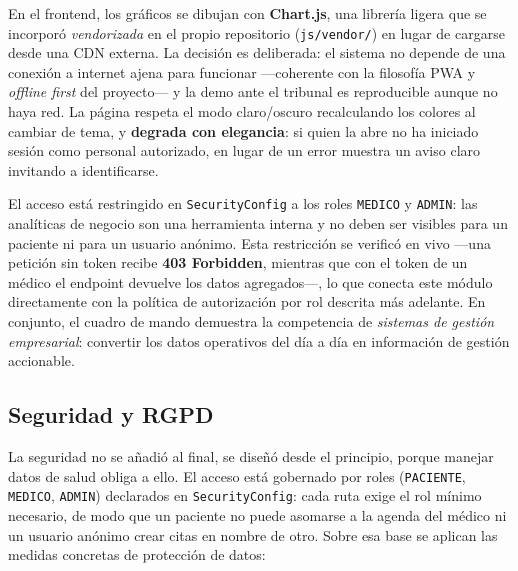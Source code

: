 \documentclass[12pt,a4paper]{report}
\begin{document}
En el frontend, los gráficos se dibujan con \textbf{Chart.js}, una librería ligera que se incorporó \emph{vendorizada} en el propio repositorio (\texttt{js/vendor/}) en lugar de cargarse desde una CDN externa. La decisión es deliberada: el sistema no depende de una conexión a internet ajena para funcionar —coherente con la filosofía PWA y \emph{offline first} del proyecto— y la demo ante el tribunal es reproducible aunque no haya red. La página respeta el modo claro/oscuro recalculando los colores al cambiar de tema, y \textbf{degrada con elegancia}: si quien la abre no ha iniciado sesión como personal autorizado, en lugar de un error muestra un aviso claro invitando a identificarse.

El acceso está restringido en \texttt{SecurityConfig} a los roles \texttt{MEDICO} y \texttt{ADMIN}: las analíticas de negocio son una herramienta interna y no deben ser visibles para un paciente ni para un usuario anónimo. Esta restricción se verificó en vivo —una petición sin token recibe \textbf{403 Forbidden}, mientras que con el token de un médico el endpoint devuelve los datos agregados—, lo que conecta este módulo directamente con la política de autorización por rol descrita más adelante. En conjunto, el cuadro de mando demuestra la competencia de \emph{sistemas de gestión empresarial}: convertir los datos operativos del día a día en información de gestión accionable.

\subsection{Seguridad y RGPD}

La seguridad no se añadió al final, se diseñó desde el principio, porque manejar datos de salud obliga a ello. El acceso está gobernado por roles (\texttt{PACIENTE}, \texttt{MEDICO}, \texttt{ADMIN}) declarados en \texttt{SecurityConfig}: cada ruta exige el rol mínimo necesario, de modo que un paciente no puede asomarse a la agenda del médico ni un usuario anónimo crear citas en nombre de otro. Sobre esa base se aplican las medidas concretas de protección de datos:
\end{document}
